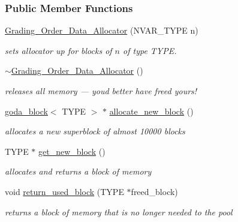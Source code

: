\subsubsection*{Public Member Functions}
\begin{DoxyCompactItemize}
\item 
\hyperlink{group__memorygroup_aa9d14580ced0d2e3d9f0a94e8e83aa85}{Grading\+\_\+\+Order\+\_\+\+Data\+\_\+\+Allocator} (N\+V\+A\+R\+\_\+\+T\+Y\+PE n)
\begin{DoxyCompactList}\small\item\em sets allocator up for blocks of $n$ of type {\ttfamily T\+Y\+PE}. \end{DoxyCompactList}\item 
\mbox{\label{group__memorygroup_a01de71b688612c55185fc1fb7fd531b9}} 
\hyperlink{group__memorygroup_a01de71b688612c55185fc1fb7fd531b9}{$\sim$\+Grading\+\_\+\+Order\+\_\+\+Data\+\_\+\+Allocator} ()
\begin{DoxyCompactList}\small\item\em releases all memory --- you\textquotesingle{}d better have freed yours! \end{DoxyCompactList}\item 
\hyperlink{group__memorygroup_uniongoda__block}{goda\+\_\+block}$<$ T\+Y\+PE $>$ $\ast$ \hyperlink{group__memorygroup_a3ac79e785e392024b24c18d60ff3fc3c}{allocate\+\_\+new\+\_\+block} ()
\begin{DoxyCompactList}\small\item\em allocates a new superblock of almost 10000 blocks \end{DoxyCompactList}\item 
T\+Y\+PE $\ast$ \hyperlink{group__memorygroup_a699e85282a021fd7b06f65b9e773eb30}{get\+\_\+new\+\_\+block} ()
\begin{DoxyCompactList}\small\item\em allocates and returns a block of memory \end{DoxyCompactList}\item 
void \hyperlink{group__memorygroup_a518a8f61da93ea93651f426e12761a07}{return\+\_\+used\+\_\+block} (T\+Y\+PE $\ast$freed\+\_\+block)
\begin{DoxyCompactList}\small\item\em returns a block of memory that is no longer needed to the pool \end{DoxyCompactList}\end{DoxyCompactItemize}

